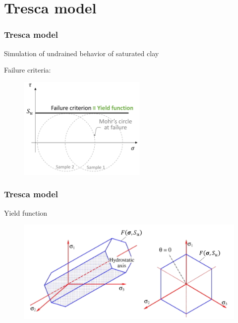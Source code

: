 \documentclass[notes]{beamer}
\begin{document}
\section{Tresca model}
\begin{frame}
\frametitle{Tresca model}
Simulation of undrained behavior of saturated clay

Failure criteria: 
\begin{figure}
	\includegraphics[width=0.55\textwidth]{figs/tresca.png}
\end{figure}
\end{frame}

\begin{frame}
\frametitle{Tresca model}
Yield function
\begin{figure}
	\includegraphics[width=\textwidth]{figs/tresca-yield.png}
\end{figure}
\end{frame}
\end{document}
